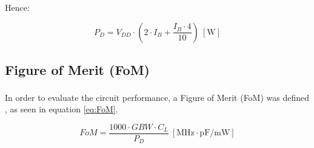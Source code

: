 Hence:

\begin{equation}
    P_D = V_{DD} \cdot \left(2 \cdot I_B + \dfrac{I_B\cdot 4}{10}\right) \ [\si{\watt}]
    \label{eq:PD}
\end{equation}

\subsection{Figure of Merit (FoM)}

In order to evaluate the circuit performance, a Figure of Merit (FoM) was defined \textsuperscript{\cite{Lab-statement}}, as seen in equation \ref{eq:FoM}.

\begin{equation}
    FoM = \frac{1000 \cdot GBW \cdot C_L}{P_D} \ [\si{\mega\hertz}\cdot\si{\pico\farad/\milli\watt}]
    \label{eq:FoM}
\end{equation}